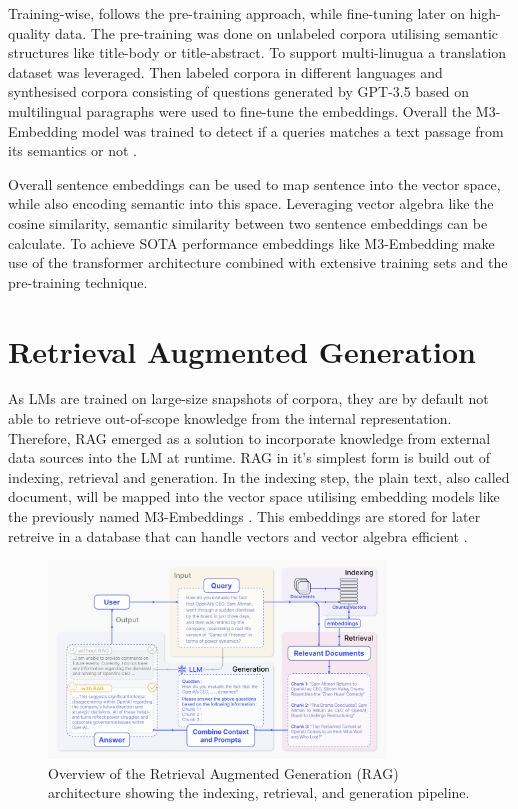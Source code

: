 \documentclass[a4paper,oneside,bibliography=totoc]{scrbook}
\begin{document}
Training-wise, \citet{Chen2024} follows the pre-training approach, while fine-tuning later on high-quality data. The pre-training was done on unlabeled corpora utilising semantic structures like title-body or title-abstract. To support multi-linugua a translation dataset was leveraged. Then labeled corpora in different languages and synthesised corpora consisting of questions generated by \ac{GPT}-3.5 based on multilingual paragraphs were used to fine-tune the embeddings. Overall the M3-Embedding model was trained to detect if a queries matches a text passage from its semantics or not \cite{Chen2024}.

Overall sentence embeddings can be used to map sentence into the vector space, while also encoding semantic into this space. Leveraging vector algebra like the cosine similarity, semantic similarity between two sentence embeddings can be calculate. To achieve SOTA performance embeddings like M3-Embedding make use of the transformer architecture combined with extensive training sets and the pre-training technique.

\section{Retrieval Augmented Generation}
\label{sec:retrieval_augmented_generation}

As \acp{LM} are trained on large-size snapshots of corpora, they are by default not able to retrieve out-of-scope knowledge from the internal representation. Therefore, \ac{RAG} emerged as a solution to incorporate knowledge from external data sources into the \ac{LM} at runtime. \ac{RAG} in it's simplest form is build out of indexing, retrieval and generation. In the indexing step, the plain text, also called document, will be mapped into the vector space utilising embedding models like the previously named M3-Embeddings \cite{Gao2024}. This embeddings are stored for later retreive in a database that can handle vectors and vector algebra efficient \cite{Gao2024,Pan2024}.

\begin{figure}[t]
  \centering
  \includegraphics[width=0.8\textwidth]{figures/RAG.png}
  \caption[Overview of the Retrieval Augmented Generation (RAG) architecture showing the indexing, retrieval, and generation pipeline]{Overview of the Retrieval Augmented Generation (RAG) architecture showing the indexing, retrieval, and generation pipeline. \cite{Gao2024}}
  \label{fig:rag}
\end{figure}
\end{document}
